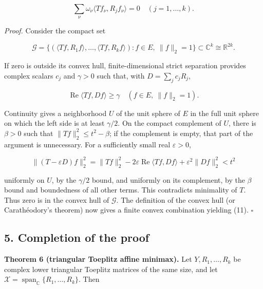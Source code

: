 \documentclass[10pt,a4paper]{article}
\begin{document}
\nopagebreak[4]

\[
\sum_\nu\omega_\nu\langle Tf_\nu,R_jf_\nu\rangle=0
\quad(j=1,\ldots,k).
\tag{11}
\]

\emph{Proof.} Consider the compact set

\nopagebreak[4]

\[
\mathcal G=
\{(\langle Tf,R_1f\rangle,\ldots,\langle Tf,R_kf\rangle):
 f\in E,\ \|f\|_2=1\}\subset\mathbb C^k\cong\mathbb R^{2k}.
\]

If zero is outside its convex hull, finite-dimensional strict separation
provides complex scalars \(c_j\) and \(\gamma>0\) such that, with
\(D=\sum_j c_j R_j\),

\nopagebreak[4]

\[
\operatorname{Re}\langle Tf,Df\rangle\ge\gamma
\quad(f\in E,\ \|f\|_2=1).
\tag{12}
\]


Continuity gives a neighborhood \(U\) of the unit sphere of \(E\) in the
full unit sphere on which the left side is at least \(\gamma/2\). On the
compact complement of \(U\), there is \(\beta>0\) such that
\(\|Tf\|_2^2\le t^2-\beta\); if the complement is empty, that part of
the argument is unnecessary. For a sufficiently small real
\(\varepsilon>0\),

\nopagebreak[4]

\[
\|(T-\varepsilon D)f\|_2^2
=\|Tf\|_2^2
-2\varepsilon\operatorname{Re}\langle Tf,Df\rangle
+\varepsilon^2\|Df\|_2^2<t^2
\]

uniformly on \(U\), by the \(\gamma/2\) bound, and uniformly on its
complement, by the \(\beta\) bound and boundedness of all other terms.
This contradicts minimality of \(T\). Thus zero is in the convex hull of
\(\mathcal G\). The definition of the convex hull (or Carathéodory's
theorem) now gives a finite convex combination yielding (11).
\(\square\)


\subsection{5. Completion of the proof}\label{completion-of-the-proof}

\textbf{Theorem 6 (triangular Toeplitz affine minimax).} Let
\(Y,R_1,\ldots,R_k\) be complex lower triangular Toeplitz matrices of
the same size, and let
\(\mathcal X=\operatorname{span}_{\mathbb C}\{R_1,\ldots,R_k\}\). Then

\nopagebreak[4]
\end{document}
